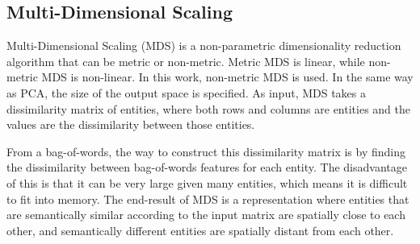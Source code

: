 \subsection{Multi-Dimensional Scaling}\label{ch2:MDS}


Multi-Dimensional Scaling  (MDS) is a non-parametric dimensionality reduction algorithm that can be metric  or non-metric. Metric MDS is linear, while non-metric MDS is non-linear. In this work, non-metric MDS is used. In the same way as PCA, the size of the output space is specified. As input, MDS takes a dissimilarity matrix of entities, where both rows and columns are entities and the values are the dissimilarity between those entities. 

From a bag-of-words, the way to construct this dissimilarity matrix is by finding the dissimilarity between bag-of-words features for each entity. The disadvantage of this is that it can be very large given many entities, which means it is difficult to fit into memory. The end-result of MDS is a representation where entities that are semantically similar according to the input matrix are spatially close to each other, and semantically different entities are spatially distant from each other.








